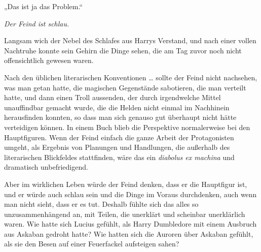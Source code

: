 „Das ist ja das Problem.“

\emph{Der Feind ist schlau.}

Langsam wich der Nebel des Schlafes aus Harrys Verstand, und nach einer vollen Nachtruhe konnte sein Gehirn die Dinge sehen, die am Tag zuvor noch nicht offensichtlich gewesen waren.

Nach den üblichen literarischen Konventionen … sollte der Feind nicht nachsehen, was man getan hatte, die magischen Gegenstände sabotieren, die man verteilt hatte, und dann einen Troll aussenden, der durch irgendwelche Mittel unauffindbar gemacht wurde, die die Helden nicht einmal im Nachhinein herausfinden konnten, so dass man sich genauso gut überhaupt nicht hätte verteidigen können. In einem Buch blieb die Perspektive normalerweise bei den Hauptfiguren. Wenn der Feind einfach die ganze Arbeit der Protagonisten umgeht, als Ergebnis von Planungen und Handlungen, die außerhalb des literarischen Blickfeldes stattfinden, wäre das ein \emph{diabolus ex machina} und dramatisch unbefriedigend.

Aber im wirklichen Leben würde der Feind denken, dass er die Hauptfigur ist, und er würde auch schlau sein und die Dinge im Voraus durchdenken, auch wenn man nicht sieht, dass er es tut. Deshalb fühlte sich das alles so unzusammenhängend an, mit Teilen, die unerklärt und scheinbar unerklärlich waren. Wie hatte sich Lucius gefühlt, als Harry Dumbledore mit einem Ausbruch aus Askaban gedroht hatte? Wie hatten sich die Auroren über Askaban gefühlt, als sie den Besen auf einer Feuerfackel aufsteigen sahen?

